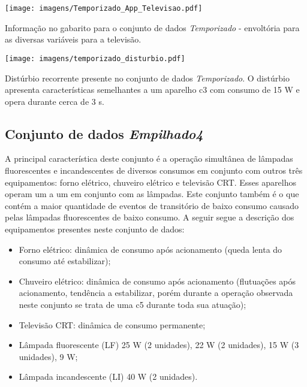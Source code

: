 \begin{SidewaysFigure}
\centering
\texttt{[image: imagens/Temporizado\_App\_Televisao.pdf]}
\caption{Informação no gabarito para o conjunto de dados
\emph{Temporizado} - envoltória para as diversas variáveis para a
televisão.}
\label{fig:temporizado_televisao}
\end{SidewaysFigure}

\begin{SidewaysFigure}
\centering
\texttt{[image: imagens/temporizado\_disturbio.pdf]}
\caption[Distúrbio recorrente presente no conjunto de dados \emph{Temporizado}.]
{Distúrbio recorrente presente no conjunto de dados
\emph{Temporizado}. O distúrbio apresenta características semelhantes
a um aparelho \acs{c3} com consumo de 15 W e opera durante cerca de
3 s.}
\label{fig:temporizado_disturbio}
\end{SidewaysFigure}

\FloatBarrier

\subsection{Conjunto de dados \emph{Empilhado4}}
\label{ssec:emp4}

A principal característica deste conjunto é a operação simultânea de
lâmpadas fluorescentes e incandescentes de diversos consumos em
conjunto com outros três equipamentos:
forno elétrico, chuveiro elétrico e televisão CRT. Esses aparelhos
operam um a um em conjunto com as lâmpadas. Este conjunto também é o
que contém a maior quantidade de eventos de transitório de baixo
consumo causado pelas lâmpadas fluorescentes de baixo consumo. A
seguir segue a descrição dos equipamentos presentes neste conjunto de
dados:

\begin{itemize}
\item Forno elétrico: dinâmica de consumo após acionamento (queda
lenta do consumo até estabilizar);
\item Chuveiro elétrico: dinâmica de consumo após acionamento (flutuações
após acionamento, tendência a estabilizar, porém durante a operação
observada neste conjunto se trata de uma \acs{c5} durante toda sua
atuação);
\item Televisão CRT: dinâmica de consumo permanente;
\item Lâmpada fluorescente (LF) 25 W (2 unidades), 22 W (2 unidades), 15 W (3
unidades), 9 W;
\item Lâmpada incandescente (LI) 40 W (2 unidades).
\end{itemize}

